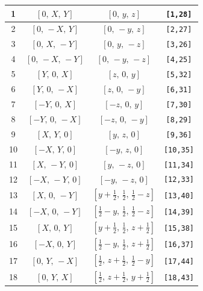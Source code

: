 \documentclass[fleqn,8pt]{jsarticle}
\begin{document}
\begin{longtable}{cccc}
1 & $\left[ 0,\, X,\, Y \right]$ & $\left[ 0,\, y,\, z \right]$ & {\tt [1,28]} \\ \hline
2 & $\left[ 0,\, - X,\, Y \right]$ & $\left[ 0,\, - y,\, z \right]$ & {\tt [2,27]} \\ \hline
3 & $\left[ 0,\, X,\, - Y \right]$ & $\left[ 0,\, y,\, - z \right]$ & {\tt [3,26]} \\ \hline
4 & $\left[ 0,\, - X,\, - Y \right]$ & $\left[ 0,\, - y,\, - z \right]$ & {\tt [4,25]} \\ \hline
5 & $\left[ Y,\, 0,\, X \right]$ & $\left[ z,\, 0,\, y \right]$ & {\tt [5,32]} \\ \hline
6 & $\left[ Y,\, 0,\, - X \right]$ & $\left[ z,\, 0,\, - y \right]$ & {\tt [6,31]} \\ \hline
7 & $\left[ - Y,\, 0,\, X \right]$ & $\left[ - z,\, 0,\, y \right]$ & {\tt [7,30]} \\ \hline
8 & $\left[ - Y,\, 0,\, - X \right]$ & $\left[ - z,\, 0,\, - y \right]$ & {\tt [8,29]} \\ \hline
9 & $\left[ X,\, Y,\, 0 \right]$ & $\left[ y,\, z,\, 0 \right]$ & {\tt [9,36]} \\ \hline
10 & $\left[ - X,\, Y,\, 0 \right]$ & $\left[ - y,\, z,\, 0 \right]$ & {\tt [10,35]} \\ \hline
11 & $\left[ X,\, - Y,\, 0 \right]$ & $\left[ y,\, - z,\, 0 \right]$ & {\tt [11,34]} \\ \hline
12 & $\left[ - X,\, - Y,\, 0 \right]$ & $\left[ - y,\, - z,\, 0 \right]$ & {\tt [12,33]} \\ \hline
13 & $\left[ X,\, 0,\, - Y \right]$ & $\left[ y + \frac{1}{2},\, \frac{1}{2},\, \frac{1}{2} - z \right]$ & {\tt [13,40]} \\ \hline
14 & $\left[ - X,\, 0,\, - Y \right]$ & $\left[ \frac{1}{2} - y,\, \frac{1}{2},\, \frac{1}{2} - z \right]$ & {\tt [14,39]} \\ \hline
15 & $\left[ X,\, 0,\, Y \right]$ & $\left[ y + \frac{1}{2},\, \frac{1}{2},\, z + \frac{1}{2} \right]$ & {\tt [15,38]} \\ \hline
16 & $\left[ - X,\, 0,\, Y \right]$ & $\left[ \frac{1}{2} - y,\, \frac{1}{2},\, z + \frac{1}{2} \right]$ & {\tt [16,37]} \\ \hline
17 & $\left[ 0,\, Y,\, - X \right]$ & $\left[ \frac{1}{2},\, z + \frac{1}{2},\, \frac{1}{2} - y \right]$ & {\tt [17,44]} \\ \hline
18 & $\left[ 0,\, Y,\, X \right]$ & $\left[ \frac{1}{2},\, z + \frac{1}{2},\, y + \frac{1}{2} \right]$ & {\tt [18,43]} \\ \hline

\end{longtable}
\end{document}
